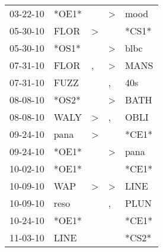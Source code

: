 \begin{supertabular}{p{0.07\textwidth}p{0.06\textwidth}p{0.02\textwidth}p{0.02\textwidth}p{0.06\textwidth}}
          03-22-10\textsuperscript{} &                            *OE1* &                  &     \textgreater &           mood\textsuperscript{} \\
          05-30-10\textsuperscript{} &           FLOR\textsuperscript{} &     \textgreater &                  &                            *CS1* \\
          05-30-10\textsuperscript{} &                            *OS1* &                  &     \textgreater &           blbc\textsuperscript{} \\
          07-31-10\textsuperscript{} &           FLOR\textsuperscript{} &                , &     \textgreater &           MANS\textsuperscript{} \\
          07-31-10\textsuperscript{} &           FUZZ\textsuperscript{} &                  &                , &            40s\textsuperscript{} \\
          08-08-10\textsuperscript{} &                            *OS2* &                  &     \textgreater &           BATH\textsuperscript{} \\
          08-08-10\textsuperscript{} &           WALY\textsuperscript{} &     \textgreater &                , &           OBLI\textsuperscript{} \\
          09-24-10\textsuperscript{} &           pana\textsuperscript{} &     \textgreater &                  &                            *CE1* \\
          09-24-10\textsuperscript{} &                            *OE1* &                  &     \textgreater &           pana\textsuperscript{} \\
          10-02-10\textsuperscript{} &                            *OE1* &                  &                  &                            *CE1* \\
          10-09-10\textsuperscript{} &            WAP\textsuperscript{} &     \textgreater &     \textgreater &           LINE\textsuperscript{} \\
          10-09-10\textsuperscript{} &           reso\textsuperscript{} &                  &                , &           PLUN\textsuperscript{} \\
          10-24-10\textsuperscript{} &                            *OE1* &                  &                  &                            *CE1* \\
          11-03-10\textsuperscript{} &           LINE\textsuperscript{} &                  &                  &                            *CS2* \\

\end{supertabular}
